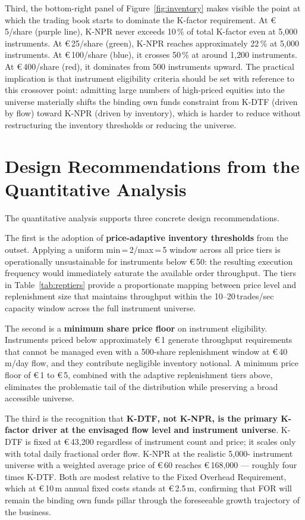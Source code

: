 \documentclass[12pt,a4paper]{report}
\newcommand{\eur}{\euro\,}
\begin{document}
Third, the bottom-right panel of Figure~\ref{fig:inventory} makes visible the
point at which the trading book starts to dominate the K-factor requirement.
At \eur{}5/share (purple line), K-NPR never exceeds 10\,\% of total K-factor
even at 5{,}000 instruments. At \eur{}25/share (green), K-NPR reaches
approximately 22\,\% at 5{,}000 instruments. At \eur{}100/share (blue), it
crosses 50\,\% at around 1{,}200 instruments. At \eur{}400/share (red), it
dominates from 500 instruments upward. The practical implication is that
instrument eligibility criteria should be set with reference to this crossover
point: admitting large numbers of high-priced equities into the universe
materially shifts the binding own funds constraint from K-DTF (driven by flow)
toward K-NPR (driven by inventory), which is harder to reduce without
restructuring the inventory thresholds or reducing the universe.

\section{Design Recommendations from the Quantitative Analysis}

The quantitative analysis supports three concrete design recommendations.

The first is the adoption of \textbf{price-adaptive inventory thresholds} from
the outset. Applying a uniform min\,=\,2/max\,=\,5 window across all price
tiers is operationally unsustainable for instruments below \eur{}50: the
resulting execution frequency would immediately saturate the available order
throughput. The tiers in Table~\ref{tab:reptiers} provide a proportionate
mapping between price level and replenishment size that maintains throughput
within the 10--20\,trades/sec capacity window across the full instrument
universe.

The second is a \textbf{minimum share price floor} on instrument eligibility.
Instruments priced below approximately \eur{}1 generate throughput requirements
that cannot be managed even with a 500-share replenishment window at
\eur{}40\,m/day flow, and they contribute negligible inventory notional. A
minimum price floor of \eur{}1 to \eur{}5, combined with the adaptive
replenishment tiers above, eliminates the problematic tail of the distribution
while preserving a broad accessible universe.

The third is the recognition that \textbf{K-DTF, not K-NPR, is the primary
K-factor driver at the envisaged flow level and instrument universe}. K-DTF is
fixed at \eur{}43{,}200 regardless of instrument count and price; it scales
only with total daily fractional order flow. K-NPR at the realistic 5{,}000-
instrument universe with a weighted average price of \eur{}60 reaches
\eur{}168{,}000 --- roughly four times K-DTF. Both are modest relative to the
Fixed Overhead Requirement, which at \eur{}10\,m annual fixed costs stands at
\eur{}2.5\,m, confirming that FOR will remain the binding own funds pillar
through the foreseeable growth trajectory of the business.

\end{document}
